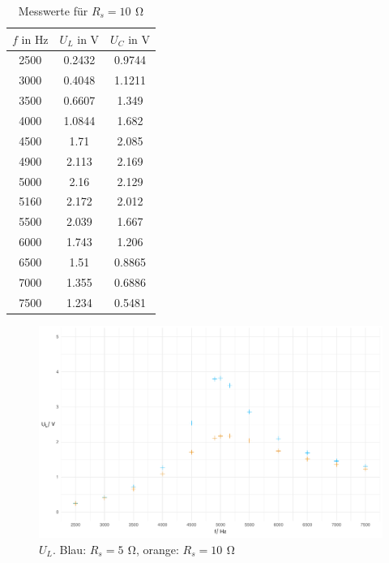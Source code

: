 \documentclass[a4paper, 12pt]{article}
\begin{document}
    \begin{table}[H]
      \begin{center}
      \begin{tabular}{@{}ccc@{}}
      \toprule
         $f \text{ in } \si{\hertz}$   &   $U_L \text{ in } \si{\volt}$     &  $U_C \text{ in } \si{\volt}$      \\ \midrule
        2500 & 0.2432 & 0.9744 \\
        3000 & 0.4048 & 1.1211 \\
        3500 & 0.6607 & 1.349  \\
        4000 & 1.0844 & 1.682  \\
        4500 & 1.71   & 2.085  \\
        4900 & 2.113  & 2.169  \\
        5000 & 2.16   & 2.129  \\
        5160 & 2.172  & 2.012  \\
        5500 & 2.039  & 1.667  \\
        6000 & 1.743  & 1.206  \\
        6500 & 1.51   & 0.8865 \\
        7000 & 1.355  & 0.6886 \\
        7500 & 1.234  & 0.5481 \\ \bottomrule
      \end{tabular}
      \caption*{Messwerte für $R_s=10 \,\ \si{\ohm}$}
    \end{center}
    \end{table}

    \begin{figure}[H]
      \begin{center}
      \includegraphics[scale=0.3819660112501051]{./R/3_5/3_5_UL.pdf}
      \caption*{ $U_L$. Blau: $R_s = 5 \,\ \si{\ohm}$, orange: $R_s = 10 \,\ \si{\ohm}$}
      \end{center}
    \end{figure}
\end{document}

